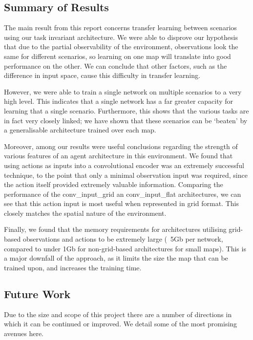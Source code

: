 \subsection{Summary of Results}
The main result from this report concerns transfer learning between scenarios using our task invariant architecture. We were able to disprove our hypothesis that due to the partial observability of the environment, observations look the same for different scenarios, so learning on one map will translate into good performance on the other. We can conclude that other factors, such as the difference in input space, cause this difficulty in transfer learning.

However, we were able to train a single network on multiple scenarios to a very high level. This indicates that a single network has a far greater capacity for learning that a single scenario. Furthermore, this shows that the various tasks are in fact very closely linked; we have shown that these scenarios can be `beaten' by a generalisable architecture trained over each map.


Moreover, among our results were useful conclusions regarding the strength of various features of an agent architecture in this environment. We found that using actions as inputs into a convolutional encoder was an extremely successful technique, to the point that only a minimal observation input was required, since the action itself provided extremely valuable information. Comparing the performance of the conv\_input\_grid an conv\_input\_flat architectures, we can see that this action input is most useful when represented in grid format. This closely matches the spatial nature of the environment.

Finally, we found that the memory requirements for architectures utilising grid-based observations and actions to be extremely large (~5Gb per network, compared to under 1Gb for non-grid-based architectures for small maps). This is a major downfall of the approach, as it limits the size the map that can be trained upon, and increases the training time.





\subsection{Future Work}

Due to the size and scope of this project there are a number of directions in which it can be continued or improved. We detail some of the most promising avenues here.


